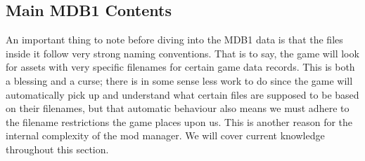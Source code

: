 \documentclass{article}
\begin{document}
\subsection{Main MDB1 Contents}
An important thing to note before diving into the MDB1 data is that the files inside it follow very strong naming conventions. That is to say, the game will look for assets with very specific filenames for certain game data records. This is both a blessing and a curse; there is in some sense less work to do since the game will automatically pick up and understand what certain files are supposed to be based on their filenames, but that automatic behaviour also means we must adhere to the filename restrictions the game places upon us. This is another reason for the internal complexity of the mod manager. We will cover current knowledge throughout this section.
\end{document}
